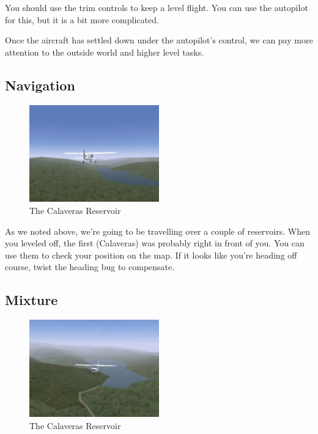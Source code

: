 You should use the trim controls to keep a level flight. You can use
the autopilot for this, but it is a bit more complicated.

Once the aircraft has settled down under the autopilot's control, we
can pay more attention to the outside world and higher level tasks.

\subsection{Navigation}

\begin{figure}[!htp]
\centering
\includegraphics[width=0.5\textwidth]{calaveras1}
\caption{The Calaveras Reservoir}
\end{figure}

As we noted above, we're going to be travelling over a couple of reservoirs.
When you leveled off, the first (Calaveras) was probably right in front of you.
You can use them to check your position on the map. If it looks like you're
heading off course, twist the heading bug to compensate.

\subsection{Mixture}

\begin{figure}[!htp]
\centering
\includegraphics[width=0.5\textwidth]{calaveras2}
\caption{The Calaveras Reservoir}
\end{figure}

